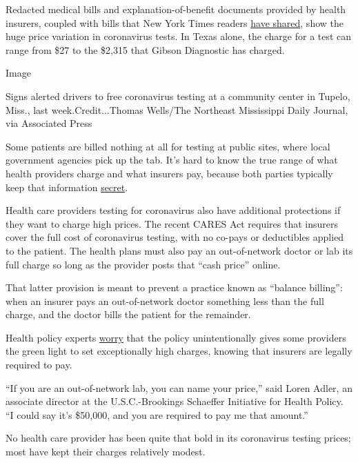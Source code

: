 Redacted medical bills and explanation-of-benefit documents provided by
health insurers, coupled with bills that New York Times readers
\href{https://twitter.com/sarahkliff/status/1270342169539366914}{have
shared}, show the huge price variation in coronavirus tests. In Texas
alone, the charge for a test can range from \$27 to the \$2,315 that
Gibson Diagnostic has charged.

Image

Signs alerted drivers to free coronavirus testing at a community center
in Tupelo, Miss., last week.Credit...Thomas Wells/The Northeast
Mississippi Daily Journal, via Associated Press

Some patients are billed nothing at all for testing at public sites,
where local government agencies pick up the tab. It's hard to know the
true range of what health providers charge and what insurers pay,
because both parties typically keep that information
\href{https://www.nytimes.com/2019/12/04/health/hospitals-trump-prices-transparency.html}{secret}.

Health care providers testing for coronavirus also have additional
protections if they want to charge high prices. The recent CARES Act
requires that insurers cover the full cost of coronavirus testing, with
no co-pays or deductibles applied to the patient. The health plans must
also pay an out-of-network doctor or lab its full charge so long as the
provider posts that ``cash price'' online.

That latter provision is meant to prevent a practice known as ``balance
billing'': when an insurer pays an out-of-network doctor something less
than the full charge, and the doctor bills the patient for the
remainder.

Health policy experts
\href{https://www.brookings.edu/blog/usc-brookings-schaeffer-on-health-policy/2020/04/09/how-the-cares-act-affects-covid-19-test-pricing/\#:~:text=Loren\%20Adler,-Associate\%20Director\%2C\%20USC\&text=Tucked\%20in\%20the\%20Coronavirus\%20Aid,The\%20first\%20of\%20these\%20(Sec.}{worry}
that the policy unintentionally gives some providers the green light to
set exceptionally high charges, knowing that insurers are legally
required to pay.

``If you are an out-of-network lab, you can name your price,'' said
Loren Adler, an associate director at the U.S.C.-Brookings Schaeffer
Initiative for Health Policy. ``I could say it's \$50,000, and you are
required to pay me that amount.''

No health care provider has been quite that bold in its coronavirus
testing prices; most have kept their charges relatively modest.

